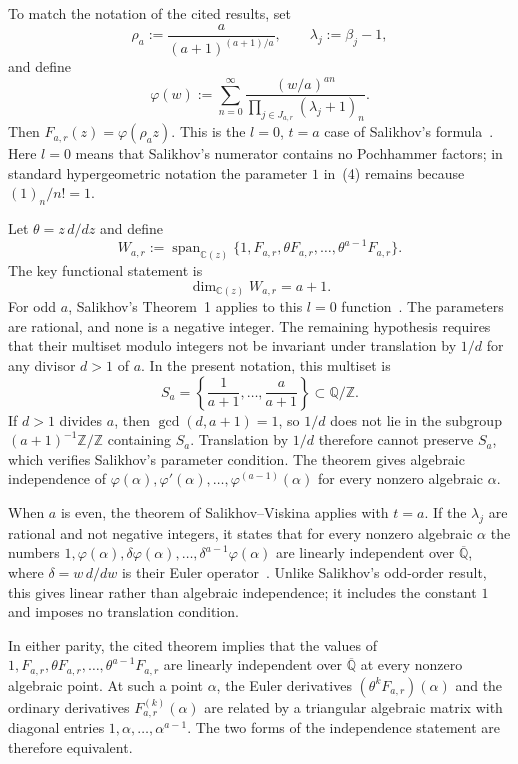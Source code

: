 \documentclass[12pt]{article}
\begin{document}
To match the notation of the cited results, set
\[
\rho_a:=\frac{a}{(a+1)^{(a+1)/a}},
\qquad
\lambda_j:=\beta_j-1,
\]
and define
\[
\varphi(w):=\sum_{n=0}^{\infty}
\frac{(w/a)^{an}}
{\displaystyle\prod_{j\in J_{a,r}}(\lambda_j+1)_n}.
\]
Then $F_{a,r}(z)=\varphi(\rho_a z)$. This is the $l=0$, $t=a$ case of Salikhov's formula~\cite[eq.~(1)]{salikhov}. Here $l=0$ means that Salikhov's numerator contains no Pochhammer factors; in standard hypergeometric notation the parameter $1$ in~(4) remains because $(1)_n/n!=1$.

Let $\theta=z\,d/dz$ and define
\[
W_{a,r}:=\operatorname{span}_{\mathbb C(z)}
\{1,F_{a,r},\theta F_{a,r},\ldots,\theta^{a-1}F_{a,r}\}.
\tag{5}
\]
The key functional statement is
\[
\dim_{\mathbb C(z)}W_{a,r}=a+1.
\tag{6}
\]
For odd $a$, Salikhov's Theorem~1 applies to this $l=0$ function~\cite[Theorem~1]{salikhov}. The parameters are rational, and none is a negative integer. The remaining hypothesis requires that their multiset modulo integers not be invariant under translation by $1/d$ for any divisor $d>1$ of $a$. In the present notation, this multiset is
\[
S_a=\left\{\frac1{a+1},\ldots,\frac a{a+1}\right\}\subset\mathbb Q/\mathbb Z.
\]
If $d>1$ divides $a$, then $\gcd(d,a+1)=1$, so $1/d$ does not lie in the subgroup $(a+1)^{-1}\mathbb Z/\mathbb Z$ containing $S_a$. Translation by $1/d$ therefore cannot preserve $S_a$, which verifies Salikhov's parameter condition. The theorem gives algebraic independence of $\varphi(\alpha),\varphi'(\alpha),\ldots,\varphi^{(a-1)}(\alpha)$ for every nonzero algebraic $\alpha$.

When $a$ is even, the theorem of Salikhov--Viskina applies with $t=a$. If the $\lambda_j$ are rational and not negative integers, it states that for every nonzero algebraic $\alpha$ the numbers $1,\varphi(\alpha),\delta\varphi(\alpha),\ldots,\delta^{a-1}\varphi(\alpha)$ are linearly independent over $\overline{\mathbb Q}$, where $\delta=w\,d/dw$ is their Euler operator~\cite[p.~833]{salikhov-viskina}. Unlike Salikhov's odd-order result, this gives linear rather than algebraic independence; it includes the constant $1$ and imposes no translation condition.

In either parity, the cited theorem implies that the values of $1,F_{a,r},\theta F_{a,r},\ldots,\theta^{a-1}F_{a,r}$ are linearly independent over $\overline{\mathbb Q}$ at every nonzero algebraic point. At such a point $\alpha$, the Euler derivatives $(\theta^kF_{a,r})(\alpha)$ and the ordinary derivatives $F_{a,r}^{(k)}(\alpha)$ are related by a triangular algebraic matrix with diagonal entries $1,\alpha,\ldots,\alpha^{a-1}$. The two forms of the independence statement are therefore equivalent.
\end{document}
